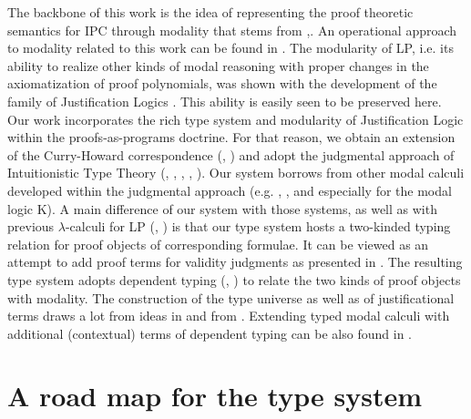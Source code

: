 \documentclass[11pt]{entcs}
\begin{document}
The backbone of this work is the idea of representing the proof theoretic semantics for {\sf IPC} through modality that stems from \cite{Art01BSL},\cite{Art02CSLI}.  An operational approach to  modality related to this work can be found in \cite{Art95TR}. The modularity of {\sf LP}, i.e. its ability to realize other kinds of modal reasoning with proper changes in the axiomatization of proof polynomials, was shown with the development of the family of Justification Logics \cite{DBLP:conf/jelia/Artemov08}. This ability is easily seen to be preserved here. Our work incorporates the rich type system and modularity of Justification Logic within the proofs-as-programs doctrine. For that reason, we obtain an  extension of the Curry-Howard correspondence (\cite{Sorensen98lectureson}, \cite{citeulike:993095}) and adopt the judgmental approach of Intuitionistic Type Theory (\cite{inp:martin-loef79a}, \cite{martin-lof84:inttt}, \cite{citeulike:5251552}, \cite{citeulike:2310446}, \cite{awodey:kripke}). Our system borrows from other modal calculi developed  within the judgmental approach  (e.g. \cite{citeulike:5447115}, \cite{Goubault-Larrecq96oncomputational},\cite{Benaissa99logicalmodalities} and especially \cite{Bellin01extendedcurry-howard} for the modal logic {\sf K}). A main difference of our system with those systems, as well as with previous $\lambda$-calculi for {\sf LP} (\cite{AA00}, \cite{ArtBon07LFCS}) is that our type system  hosts a two-kinded typing relation for proof objects of corresponding formulae. It can be viewed as an attempt to add proof terms for validity judgments as presented in \cite{citeulike:5447115}.  The resulting type system adopts dependent typing (\cite{citeulike:4846}, \cite{Norell08dependentlytyped}) to relate the two kinds of proof objects with modality.  The construction of the type universe as well as of justificational terms draws a lot from ideas in \cite{Artemov:2012:OJL:2317882.2317912}  and from \cite{FittingManuscript-FITTLO}. Extending typed modal calculi with additional (contextual) terms of dependent typing can be also found in \cite{Nanevski:2008:CMT:1352582.1352591}. 



\section{A road map for the type system}
\end{document}
